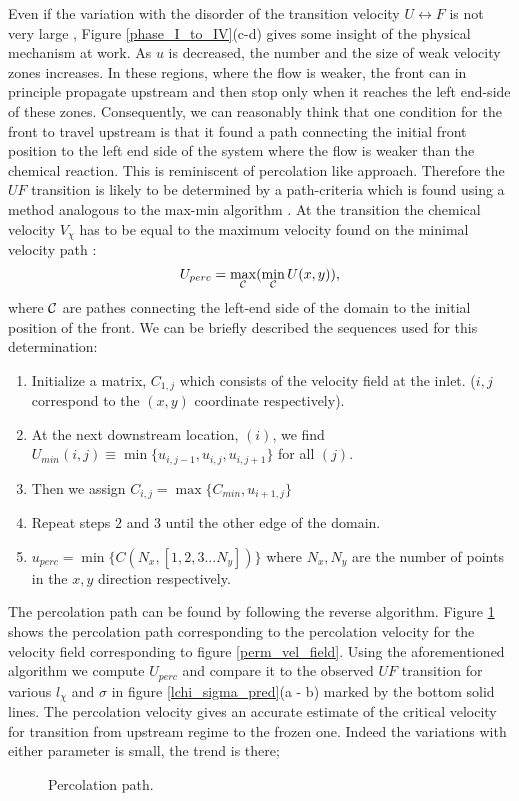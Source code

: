 \documentclass[doublecol]{epl2}
\def\figdir{./}
\begin{document}
Even if the variation with the disorder of the transition velocity $U\leftrightarrow F$ is not very large ,
Figure \ref{phase_I_to_IV}(c-d) gives some insight of the physical mechanism at work. As $u$ is decreased, the number and the size of weak velocity zones increases. In these regions, where the flow is weaker, the front can in principle propagate upstream and then stop only when it reaches the left end-side of these zones. Consequently, we can reasonably think that one condition for the front to travel upstream is that it found a path connecting the initial front position to the left end side of the system where the flow is weaker than the chemical reaction. This is reminiscent of percolation like approach. Therefore the  $UF$ transition is likely to be determined by a path-criteria which is found using  a method analogous to the max-min algorithm \cite{hansen87}. At the transition the chemical velocity $V_{\chi }$ has to be equal to the maximum velocity found on the minimal velocity path :
$$U_{perc} = \max_{\cal C} (\min_{\cal C} U(x,y)),$$
 where $\cal C$ are pathes connecting the left-end side of the domain to the initial position of the front.
We can be briefly described the sequences used for this determination:
\begin{enumerate}
 \item Initialize a matrix, $C_{1,j}$ which consists of the velocity field at the inlet. ($i,j$ correspond to the $(x,y)$ coordinate respectively).
 \item At the next downstream location, $(i)$, we find $U_{min}(i,j) \equiv \min\{u_{i,j-1},u_{i,j},u_{i,j+1}\}$ for all $(j)$.
 \item Then we assign $C_{i,j} = \max\{C_{min} , u_{i+1,j}\}$
 \item Repeat steps $2$ and $3$ until the other edge of the domain.
 \item $u_{perc} = \min \{C(N_x,[1,2,3...N_y])\}$ where $N_x, N_y$ are the number of points in the $x,y$ direction respectively.
\end{enumerate}
The percolation path can be found by following the reverse algorithm.
Figure \ref{perc_path} shows the percolation path corresponding to the percolation velocity for the velocity field corresponding to figure \ref{perm_vel_field}. Using the aforementioned algorithm we compute $U_{perc}$ and compare it to the observed $UF$ transition for various $l_\chi$ and $\sigma$ in figure \ref{lchi_sigma_pred}(a - b) marked by the bottom solid lines. The percolation velocity gives an accurate estimate of the critical velocity for transition from upstream regime to the frozen one. Indeed the variations with either parameter is small, the trend is there;
\begin{figure}
 \onefigure[width=0.99\hsize]{\figdir/percolation_path_casenum_1289}
        \caption{Percolation path.}
\label{perc_path}
\end{figure}
\end{document}
